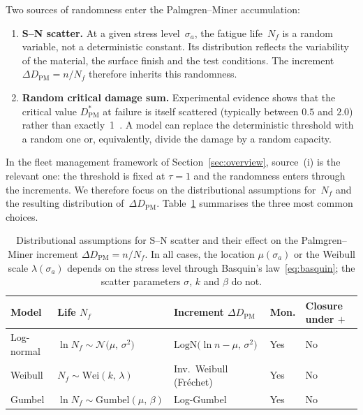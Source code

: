 \documentclass[11pt,a4paper]{article}
\theoremstyle{plain}
\theoremstyle{definition}
\theoremstyle{remark}
\begin{document}
Two sources of randomness enter the Palmgren--Miner accumulation:
\begin{enumerate}[label=(\roman*)]
  \item \textbf{S--N scatter.}
    At a given stress level~$\sigma_a$, the fatigue life~$N_f$ is a random variable, not a deterministic constant.
    Its distribution reflects the variability of the material, the surface finish and the test conditions.
    The increment $\Delta D_{\mathrm{PM}} = n/N_f$ therefore inherits this randomness.
  \item \textbf{Random critical damage sum.}
    Experimental evidence shows that the critical value $D_{\mathrm{PM}}^*$ at failure is itself scattered (typically between $0.5$ and $2.0$) rather than exactly~1~\cite{Shen1980}.
    A model can replace the deterministic threshold with a random one or, equivalently, divide the damage by a random capacity.
\end{enumerate}
In the fleet management framework of Section~\ref{sec:overview}, source~(i) is the relevant one: the threshold is fixed at $\tau = 1$ and the randomness enters through the increments.
We therefore focus on the distributional assumptions for~$N_f$ and the resulting distribution of~$\Delta D_{\mathrm{PM}}$.
Table~\ref{tab:sn_scatter} summarises the three most common choices.

\begin{table}[htbp]
\centering
\caption{Distributional assumptions for S--N scatter and their effect on the Palmgren--Miner increment $\Delta D_{\mathrm{PM}} = n/N_f$.
In all cases, the location $\mu(\sigma_a)$ or the Weibull scale $\lambda(\sigma_a)$ depends on the stress level through Basquin's law~\eqref{eq:basquin}; the scatter parameters $\sigma$, $k$ and $\beta$ do not.}
\label{tab:sn_scatter}
\small
\begin{tabularx}{\linewidth}{@{}>{\hsize=0.795\hsize\raggedright\arraybackslash}X>{\hsize=1.288\hsize\raggedright\arraybackslash}X>{\hsize=1.326\hsize\raggedright\arraybackslash}X>{\hsize=0.455\hsize\raggedright\arraybackslash}X>{\hsize=1.136\hsize\raggedright\arraybackslash}X@{}}
\toprule
\rowcolor{headgrey}
\textbf{Model} & \textbf{Life} $N_f$ & \textbf{Increment} $\Delta D_{\mathrm{PM}}$ & \textbf{Mon.} & \textbf{Closure under $+$} \\
\midrule
Log-normal
  & $\ln N_f \sim \mathcal{N}\!\bigl(\mu,\,\sigma^2\bigr)$
  & $\mathrm{LogN}\!\bigl(\ln n {-} \mu,\,\sigma^2\bigr)$
  & Yes
  & No \\[4pt]
Weibull
  & $N_f \sim \mathrm{Wei}(k,\,\lambda)$
  & Inv.\ Weibull (Fr\'echet)
  & Yes
  & No \\[4pt]
Gumbel
  & $\ln N_f \sim \mathrm{Gumbel}(\mu,\,\beta)$
  & Log-Gumbel
  & Yes
  & No \\
\bottomrule
\end{tabularx}
\end{table}
\end{document}
